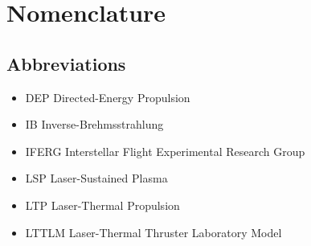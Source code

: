 \chapter*{Nomenclature}
\setlength{\columnsep}{1cm}
\newenvironment{nomtable}
    {
        \centering
        \tabularx{\columnwidth}{r>{\raggedright\arraybackslash}X}
    }
    {
        \endtabularx
    }
\newenvironment{nomlist}
    {
        \begin{itemize}[leftmargin=1.5cm]
            \raggedright
            \setlength{\parsep}{0pt}
            \setlength{\itemsep}{-4pt}
    }
    {
        \end{itemize}
    }
\begin{multicols*}{2}
    \section*{Abbreviations}

    \begin{nomlist}
        \item[DEP]              Directed-Energy Propulsion
        \item[IB]               Inverse-Brehmsstrahlung 
        \item[IFERG]            Interstellar Flight Experimental Research Group
        \item[LSP]              Laser-Sustained Plasma
        \item[LTP]              Laser-Thermal Propulsion
        \item[LTTLM]            Laser-Thermal Thruster Laboratory Model
    \end{nomlist}


\end{multicols*}
